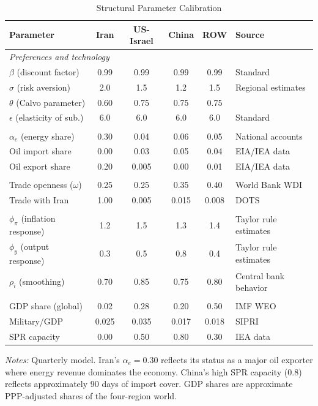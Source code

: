 \documentclass[12pt]{article}
\begin{document}
\begin{table}[H]
\centering
\small
\begin{threeparttable}
\caption{Structural Parameter Calibration}
\label{tab:calibration}
\begin{tabular}{@{}lccccl@{}}
\toprule
Parameter & Iran & US-Israel & China & ROW & Source \\
\midrule
\multicolumn{6}{l}{\textit{Preferences and technology}} \\
$\beta$ (discount factor) & 0.99 & 0.99 & 0.99 & 0.99 & Standard \\
$\sigma$ (risk aversion) & 2.0 & 1.5 & 1.2 & 1.5 & Regional estimates \\
$\theta$ (Calvo parameter) & 0.60 & 0.75 & 0.75 & 0.75 & \citet{gali2015monetary} \\
$\epsilon$ (elasticity of sub.) & 6.0 & 6.0 & 6.0 & 6.0 & Standard \\
\addlinespace
\multicolumn{6}{l}{\textit{Energy sector}} \\
$\alpha_e$ (energy share) & 0.30 & 0.04 & 0.06 & 0.05 & National accounts \\
Oil import share & 0.00 & 0.03 & 0.05 & 0.04 & EIA/IEA data \\
Oil export share & 0.20 & 0.005 & 0.00 & 0.01 & EIA/IEA data \\
\addlinespace
\multicolumn{6}{l}{\textit{Trade}} \\
Trade openness ($\omega$) & 0.25 & 0.25 & 0.35 & 0.40 & World Bank WDI \\
Trade with Iran & 1.00 & 0.005 & 0.015 & 0.008 & DOTS \\
\addlinespace
\multicolumn{6}{l}{\textit{Monetary policy}} \\
$\phi_\pi$ (inflation response) & 1.2 & 1.5 & 1.3 & 1.4 & Taylor rule estimates \\
$\phi_y$ (output response) & 0.3 & 0.5 & 0.8 & 0.4 & Taylor rule estimates \\
$\rho_i$ (smoothing) & 0.70 & 0.85 & 0.75 & 0.80 & Central bank behavior \\
\addlinespace
\multicolumn{6}{l}{\textit{Scale and military}} \\
GDP share (global) & 0.02 & 0.28 & 0.20 & 0.50 & IMF WEO \\
Military/GDP & 0.025 & 0.035 & 0.017 & 0.018 & SIPRI \\
SPR capacity & 0.00 & 0.50 & 0.80 & 0.30 & IEA data \\
\bottomrule
\end{tabular}
\begin{tablenotes}[flushleft]
\small
\item \textit{Notes:} Quarterly model. Iran's $\alpha_e = 0.30$ reflects its status as a major oil exporter where energy revenue dominates the economy. China's high SPR capacity (0.8) reflects approximately 90 days of import cover. GDP shares are approximate PPP-adjusted shares of the four-region world.
\end{tablenotes}
\end{threeparttable}
\end{table}
\end{document}
